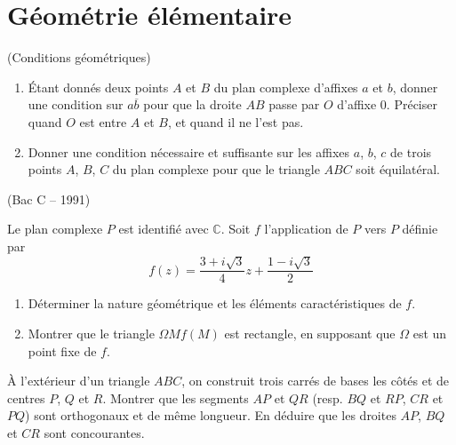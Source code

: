 \documentclass[a4paper,12pt,reqno]{amsart}
\begin{document}

\section{Géométrie élémentaire}


\begin{exo} (Conditions géométriques)
  \begin{enumerate}
    \item Étant donnés deux points $A$ et $B$ du plan complexe d'affixes $a$ et $b$, donner une condition sur $a\overline{b}$ pour que la droite $AB$ passe par $O$ d'affixe $0$. Préciser quand $O$ est entre $A$ et $B$, et quand il ne l'est pas.

    \item Donner une condition nécessaire et suffisante sur les affixes $a$, $b$, $c$ de trois points $A$, $B$, $C$ du plan complexe pour que le triangle $ABC$ soit équilatéral.
  \end{enumerate}
\end{exo}


\begin{exo} (Bac C -- 1991)

  Le plan complexe $P$ est identifié avec $\mathbb{C}$. Soit $f$ l'application de $P$ vers $P$ définie par
    $$
      f(z)=\frac{3+i\sqrt{3}}{4}z+\frac{1-i\sqrt{3}}{2}
    $$
  \begin{enumerate}
    \item Déterminer la nature géométrique et les éléments caractéristiques de $f$.
    \item Montrer que le triangle $\Omega M\! f(M)$ est rectangle, en supposant que $\Omega$ est un point fixe de $f$.
  \end{enumerate}
\end{exo}


\begin{exo}


  À l'extérieur d'un triangle $ABC$, on construit trois carrés de bases les côtés et de centres $P$, $Q$ et $R$. Montrer que les segments $AP$ et $QR$ (resp. $BQ$ et $RP$, $CR$ et $PQ$) sont orthogonaux et de même longueur. En déduire que les droites $AP$, $BQ$ et $CR$ sont concourantes.
\end{exo}
\end{document}
